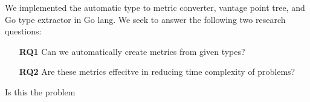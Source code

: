 We implemented the automatic type to metric converter,
vantage point tree,
and Go type extractor in Go lang.
We seek to answer the following two research questions:
\begin{itemize}
    \item[\textbf{RQ1}] Can we automatically create metrics from given types?
    \item[\textbf{RQ2}] Are these metrics effecitve in reducing time complexity of problems?
\end{itemize}

Is this the problem